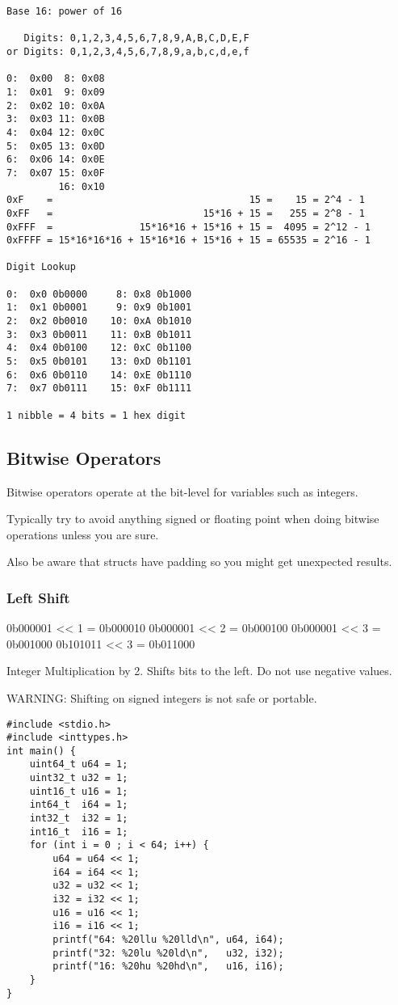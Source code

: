 \documentclass[11pt]{article}
\begin{document}
\begin{verbatim}
Base 16: power of 16

   Digits: 0,1,2,3,4,5,6,7,8,9,A,B,C,D,E,F
or Digits: 0,1,2,3,4,5,6,7,8,9,a,b,c,d,e,f

0:  0x00  8: 0x08
1:  0x01  9: 0x09   
2:  0x02 10: 0x0A  
3:  0x03 11: 0x0B   
4:  0x04 12: 0x0C  
5:  0x05 13: 0x0D  
6:  0x06 14: 0x0E           
7:  0x07 15: 0x0F  
         16: 0x10
0xF    =                                  15 =    15 = 2^4 - 1
0xFF   =                          15*16 + 15 =   255 = 2^8 - 1
0xFFF  =               15*16*16 + 15*16 + 15 =  4095 = 2^12 - 1
0xFFFF = 15*16*16*16 + 15*16*16 + 15*16 + 15 = 65535 = 2^16 - 1

Digit Lookup

0:  0x0 0b0000     8: 0x8 0b1000
1:  0x1 0b0001     9: 0x9 0b1001  
2:  0x2 0b0010    10: 0xA 0b1010 
3:  0x3 0b0011    11: 0xB 0b1011  
4:  0x4 0b0100    12: 0xC 0b1100 
5:  0x5 0b0101    13: 0xD 0b1101 
6:  0x6 0b0110    14: 0xE 0b1110          
7:  0x7 0b0111    15: 0xF 0b1111 

1 nibble = 4 bits = 1 hex digit
\end{verbatim}

\subsection{Bitwise Operators}
\label{sec:org98bf389}

Bitwise operators operate at the bit-level for variables such as integers.

Typically try to avoid anything signed or floating point when doing
bitwise operations unless you are sure.

Also be aware that structs have padding so you might get unexpected
results.

\subsubsection{Left Shift}
\label{sec:org90e2a76}

0b000001 << 1 = 0b000010
0b000001 << 2 = 0b000100
0b000001 << 3 = 0b001000
0b101011 << 3 = 0b011000


Integer Multiplication by 2. Shifts bits to the left. Do not use negative values.

WARNING: Shifting on signed integers is not safe or portable.


\begin{verbatim}
#include <stdio.h>
#include <inttypes.h>
int main() {
    uint64_t u64 = 1;
    uint32_t u32 = 1;
    uint16_t u16 = 1;
    int64_t  i64 = 1;
    int32_t  i32 = 1;
    int16_t  i16 = 1;
    for (int i = 0 ; i < 64; i++) {
        u64 = u64 << 1;
        i64 = i64 << 1;
        u32 = u32 << 1;
        i32 = i32 << 1;
        u16 = u16 << 1;
        i16 = i16 << 1;
        printf("64: %20llu %20lld\n", u64, i64);
        printf("32: %20lu %20ld\n",   u32, i32);
        printf("16: %20hu %20hd\n",   u16, i16);
    }
}
\end{verbatim}
\end{document}
